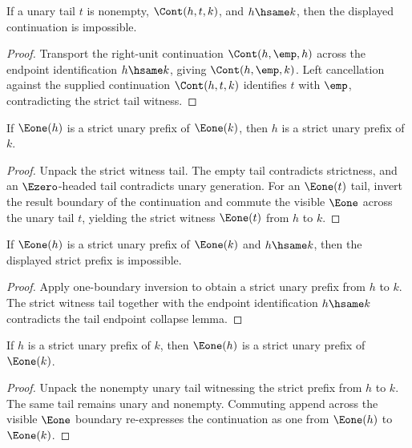 \begin{lemma}
\label{lem:nat-unary-strict-prefix-tail-endpoint-hsame-absurd}
If a unary tail \(t\) is nonempty, \(\Cont(h,t,k)\), and \(h\hsame k\), then
the displayed continuation is impossible.
\end{lemma}
\begin{proof}
Transport the right-unit continuation \(\Cont(h,\emp,h)\) across the endpoint
identification \(h\hsame k\), giving \(\Cont(h,\emp,k)\). Left cancellation
against the supplied continuation \(\Cont(h,t,k)\) identifies \(t\) with
\(\emp\), contradicting the strict tail witness.
\end{proof}

\begin{theorem}
\label{thm:nat-unary-strict-prefix-e1-inversion}
If \(\Eone(h)\) is a strict unary prefix of \(\Eone(k)\), then \(h\) is a strict unary prefix of \(k\).
\end{theorem}
\begin{proof}
Unpack the strict witness tail. The empty tail contradicts strictness, and an \(\Ezero\)-headed tail contradicts unary generation. For an \(\Eone(t)\) tail, invert the result boundary of the continuation and commute the visible \(\Eone\) across the unary tail \(t\), yielding the strict witness \(\Eone(t)\) from \(h\) to \(k\).
\end{proof}

\begin{lemma}
\label{lem:nat-unary-strict-prefix-e1-endpoint-hsame-absurd}
If \(\Eone(h)\) is a strict unary prefix of \(\Eone(k)\) and \(h\hsame k\),
then the displayed strict prefix is impossible.
\end{lemma}
\begin{proof}
Apply one-boundary inversion to obtain a strict unary prefix from \(h\) to
\(k\). The strict witness tail together with the endpoint identification
\(h\hsame k\) contradicts the tail endpoint collapse lemma.
\end{proof}

\begin{theorem}
\label{thm:nat-unary-strict-prefix-e1-congr}
If $h$ is a strict unary prefix of $k$, then $\Eone(h)$ is a strict unary
prefix of $\Eone(k)$.
\end{theorem}
\begin{proof}
Unpack the nonempty unary tail witnessing the strict prefix from $h$ to
$k$. The same tail remains unary and nonempty. Commuting append across the
visible $\Eone$ boundary re-expresses the continuation as one from
$\Eone(h)$ to $\Eone(k)$.
\end{proof}

